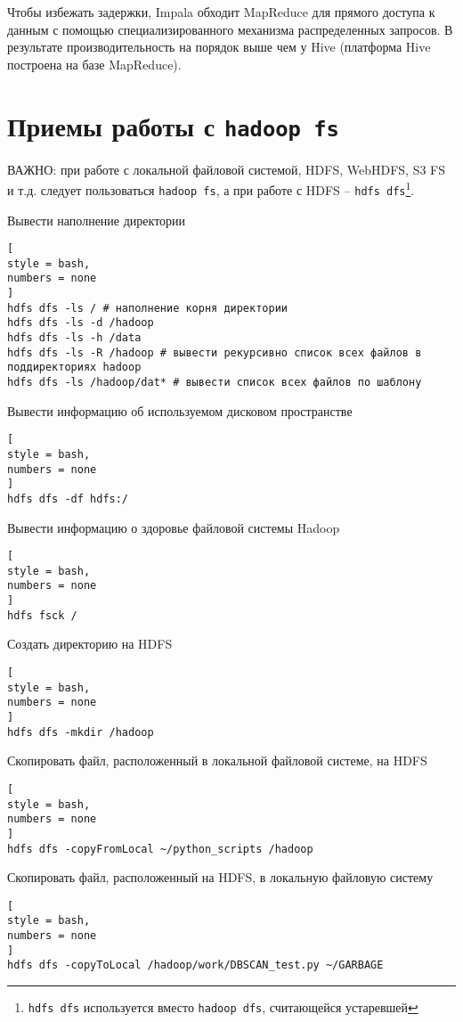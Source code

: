 \documentclass[%
	11pt,
	a4paper,
	utf8,
		]{article}
\begin{document}
Чтобы избежать задержки, Impala обходит MapReduce для прямого доступа к данным с помощью специализированного механизма распределенных запросов. В результате производительность на порядок выше чем у Hive (платформа Hive построена на базе MapReduce).


\section{Приемы работы с \texttt{hadoop fs}}

ВАЖНО: при работе с локальной файловой системой, HDFS, WebHDFS, S3 FS и т.д. следует пользоваться \texttt{hadoop fs}, а при работе с HDFS -- \texttt{hdfs dfs}\footnote{\texttt{hdfs dfs} используется вместо \texttt{hadoop dfs}, считающейся устаревшей}.

Вывести наполнение директории
\begin{lstlisting}[
style = bash,
numbers = none	
]
hdfs dfs -ls / # наполнение корня директории
hdfs dfs -ls -d /hadoop
hdfs dfs -ls -h /data
hdfs dfs -ls -R /hadoop # вывести рекурсивно список всех файлов в поддиректориях hadoop
hdfs dfs -ls /hadoop/dat* # вывести список всех файлов по шаблону
\end{lstlisting}

Вывести информацию об используемом дисковом пространстве
\begin{lstlisting}[
style = bash,
numbers = none	
]
hdfs dfs -df hdfs:/
\end{lstlisting}

Вывести информацию о здоровье файловой системы Hadoop
\begin{lstlisting}[
style = bash,
numbers = none	
]
hdfs fsck /
\end{lstlisting}

Создать директорию на HDFS
\begin{lstlisting}[
style = bash,
numbers = none	
]
hdfs dfs -mkdir /hadoop
\end{lstlisting}

Скопировать файл, расположенный в локальной файловой системе, на HDFS
\begin{lstlisting}[
style = bash,
numbers = none	
]
hdfs dfs -copyFromLocal ~/python_scripts /hadoop
\end{lstlisting}

Скопировать файл, расположенный на HDFS, в локальную файловую систему
\begin{lstlisting}[
style = bash,
numbers = none	
]
hdfs dfs -copyToLocal /hadoop/work/DBSCAN_test.py ~/GARBAGE
\end{lstlisting}
\end{document}
